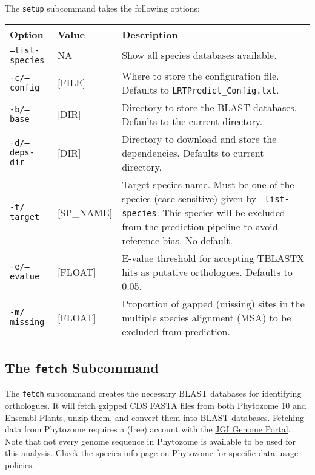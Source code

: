 \documentclass[12pt]{article}
\begin{document}
\par The \texttt{setup} subcommand takes the following options:
\begin{table}[H]
    \centering
    \begin{tabular}{p{105pt} l p{260pt}}
    \toprule
    Option & Value & Description \\
    \midrule
    \texttt{--list-species} & NA & Show all species databases available. \\
    \midrule
    \texttt{-c/--config} & [FILE] & Where to store the configuration file. Defaults to \texttt{LRTPredict\_Config.txt}. \\
    \midrule
    \texttt{-b/--base} & [DIR] & Directory to store the BLAST databases. Defaults to the current directory.\\
    \midrule
    \texttt{-d/--deps-dir} & [DIR] & Directory to download and store the dependencies. Defaults to current directory.\\
    \midrule
    \texttt{-t/--target} & [SP\_NAME] & Target species name. Must be one of the species (case sensitive) given by \texttt{--list-species}. This species will be excluded from the prediction pipeline to avoid reference bias. No default.\\
    \midrule
    \texttt{-e/--evalue} & [FLOAT] & E-value threshold for accepting TBLASTX hits as putative orthologues. Defaults to 0.05.\\
    \midrule
    \texttt{-m/--missing} & [FLOAT] & Proportion of gapped (missing) sites in the multiple species alignment (MSA) to be excluded from prediction.\\
    \bottomrule
    \end{tabular}
\end{table}

\subsection*{The \texttt{fetch} Subcommand}
\par The \texttt{fetch} subcommand creates the necessary BLAST databases for
identifying orthologues. It will fetch gzipped CDS FASTA files from both
Phytozome 10 and Ensembl Plants, unzip them, and convert them into BLAST
databases. Fetching data from Phytozome requires a (free) account with
the \href{http://genome.jgi.doe.gov/}{JGI Genome Portal}. Note that not every
genome sequence in Phytozome is available to be used for this analysis. Check
the species info page on Phytozome for specific data usage policies.
\end{document}
